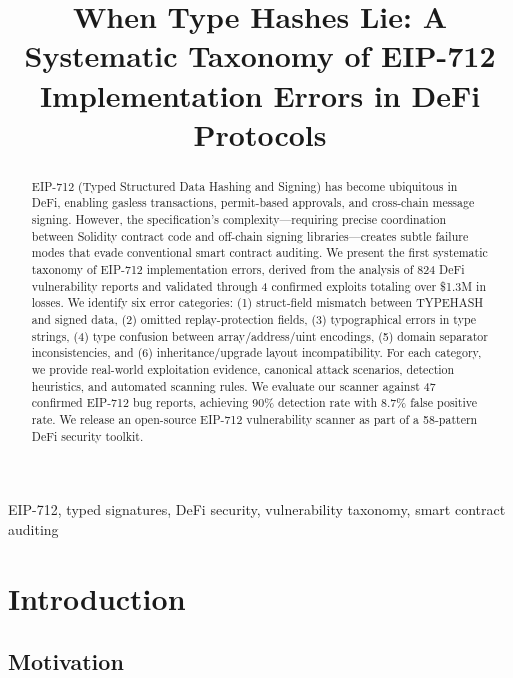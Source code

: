 \documentclass[conference]{IEEEtran}
\begin{document}
\title{When Type Hashes Lie: A Systematic Taxonomy of EIP-712 Implementation Errors in DeFi Protocols}

\author{
}

\maketitle

\begin{abstract}
EIP-712 (Typed Structured Data Hashing and Signing) has become ubiquitous in DeFi, enabling gasless transactions, permit-based approvals, and cross-chain message signing. However, the specification's complexity---requiring precise coordination between Solidity contract code and off-chain signing libraries---creates subtle failure modes that evade conventional smart contract auditing. We present the first systematic taxonomy of EIP-712 implementation errors, derived from the analysis of 824 DeFi vulnerability reports and validated through 4 confirmed exploits totaling over \$1.3M in losses. We identify six error categories: (1) struct-field mismatch between TYPEHASH and signed data, (2) omitted replay-protection fields, (3) typographical errors in type strings, (4) type confusion between array/address/uint encodings, (5) domain separator inconsistencies, and (6) inheritance/upgrade layout incompatibility. For each category, we provide real-world exploitation evidence, canonical attack scenarios, detection heuristics, and automated scanning rules. We evaluate our scanner against 47 confirmed EIP-712 bug reports, achieving 90\% detection rate with 8.7\% false positive rate. We release an open-source EIP-712 vulnerability scanner as part of a 58-pattern DeFi security toolkit.
\end{abstract}

\begin{IEEEkeywords}
EIP-712, typed signatures, DeFi security, vulnerability taxonomy, smart contract auditing
\end{IEEEkeywords}

\section{Introduction}

\subsection{Motivation}
\end{document}
